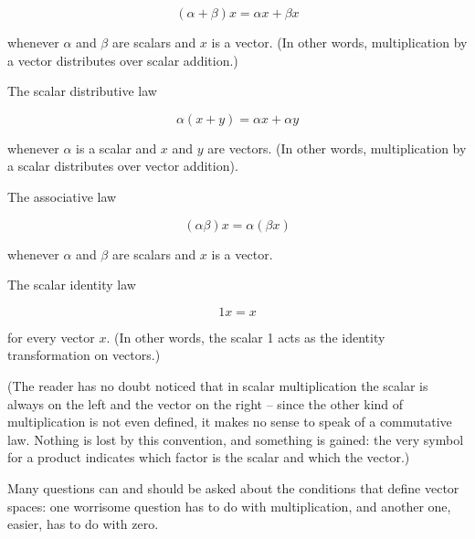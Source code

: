 \begin{equation}
    (\alpha + \beta) x = \alpha x + \beta x
\end{equation}

whenever $\alpha$ and $\beta$ are scalars and $x$ is a vector. (In other words, multiplication by a vector distributes over scalar addition.)

The scalar distributive law

\begin{equation}
    \alpha(x+y) = \alpha x + \alpha y
\end{equation}

whenever $\alpha$ is a scalar and $x$ and $y$ are vectors. (In other words, multiplication by a scalar distributes over vector addition).

The associative law

\begin{equation}
    (\alpha\beta)x = \alpha (\beta x)
\end{equation}

whenever $\alpha$ and $\beta$ are scalars and $x$ is a vector.

The scalar identity law

\begin{equation}
    1x = x
\end{equation}

for every vector $x$. (In other words, the scalar 1 acts as the identity transformation on vectors.)

(The reader has no doubt noticed that in scalar multiplication the scalar is always on the left and the vector on the right -- since the other kind of multiplication is not even defined, it makes no sense to speak of a commutative law. Nothing is lost by this convention, and something is gained: the very symbol for a product indicates which factor is the scalar and which the vector.)

Many questions can and should be asked about the conditions that define vector spaces: one worrisome question has to do with multiplication, and another one, easier, has to do with zero.


